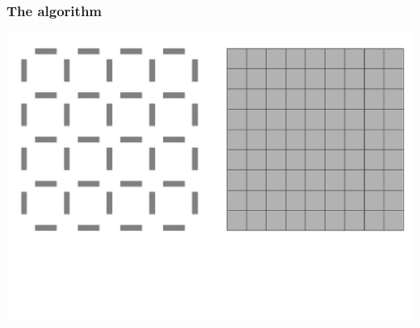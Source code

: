 \documentclass{beamer}
\begin{document}
\begin{frame}
    \frametitle{The algorithm}
    \begin{center}
        \includegraphics[width=\textwidth]{img/grid0.png}
    \end{center}

\end{frame}
\end{document}
